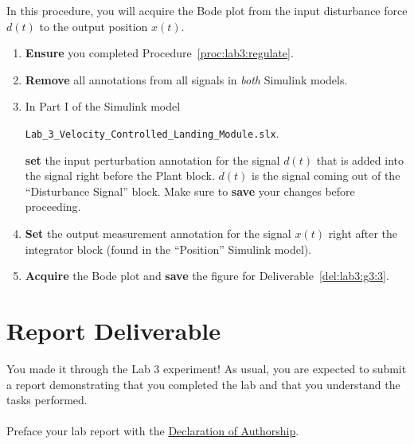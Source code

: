 \begin{procedure}[label={proc:lab3:disturbance}]
  In this procedure, you will acquire the Bode plot from the input disturbance force \(d(t)\) to the output position \(x(t).\)
  \begin{enumerate}[label={(\arabic*)}]
    \item{%
      \textbf{Ensure} you completed Procedure~\ref{proc:lab3:regulate}.
    }
    \item{%
      \textbf{Remove} all annotations from all signals in \emph{both} Simulink models.
    }
    \item{%
      In Part I of the Simulink model
      \begin{center}
        \texttt{Lab\_3\_Velocity\_Controlled\_Landing\_Module.slx}.
      \end{center}
      \textbf{set} the input perturbation annotation for the signal \(d(t)\) that is added into the signal right before the Plant block.
      \(d(t)\) is the signal coming out of the ``Disturbance Signal'' block.
      Make sure to \textbf{save} your changes before proceeding.
    }
    \item{%
      \textbf{Set} the output measurement annotation for the signal \(x(t)\) right after the integrator block (found in the ``Position'' Simulink model).
    }
    \item{%
      \textbf{Acquire} the Bode plot and \textbf{save} the figure for Deliverable~\ref{del:lab3:g3:3}.
    }
  \end{enumerate}
\end{procedure}
%

\section{Report Deliverable}
You made it through the Lab 3 experiment! As usual, you are expected to submit a report demonstrating that you completed the lab and that you understand the tasks performed.
\\
\\
Preface your lab report with the \hyperlink{intro:decl}{Declaration of Authorship}.
\\

